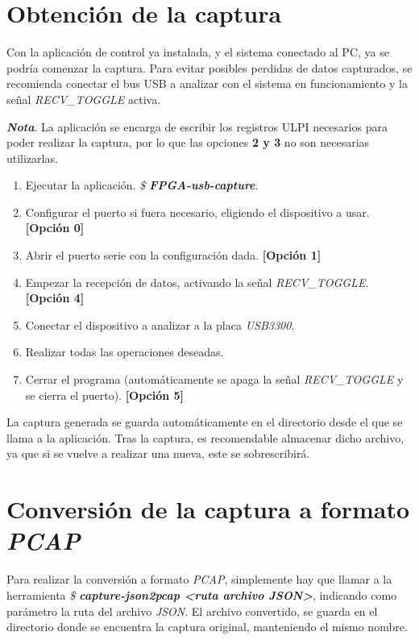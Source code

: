 \section{Obtención de la captura}
Con la aplicación de control ya instalada, y el sistema conectado al PC, ya se podría comenzar la captura.
Para evitar posibles perdidas de datos capturados, se recomienda conectar el bus USB a analizar con el sistema en funcionamiento y la señal \emph{RECV\_TOGGLE} activa.

\emph{\textbf{Nota}}. La aplicación se encarga de escribir los registros ULPI necesarios para poder realizar la captura, por lo que las opciones \textbf{2 y 3} no son necesarias utilizarlas.

\begin{enumerate}
    \item Ejecutar la aplicación. \emph{\$ \textbf{FPGA-usb-capture}}.
    \item Configurar el puerto si fuera necesario, eligiendo el dispositivo a usar. \textbf{[Opción 0]}
    \item Abrir el puerto serie con la configuración dada. \textbf{[Opción 1]}
    \item Empezar la recepción de datos, activando la señal \emph{RECV\_TOGGLE}. \textbf{[Opción 4]}
    \item Conectar el dispositivo a analizar a la placa \emph{USB3300}.
    \item Realizar todas las operaciones deseadas.
    \item Cerrar el programa (automáticamente se apaga la señal \emph{RECV\_TOGGLE} y se cierra el puerto). \textbf{[Opción 5]}
\end{enumerate}

La captura generada se guarda automáticamente en el directorio desde el que se llama a la aplicación. Tras la captura, es recomendable almacenar dicho archivo, ya que si se vuelve a realizar una nueva, este se sobrescribirá.

\section{Conversión de la captura a formato \emph{PCAP}}
Para realizar la conversión a formato \emph{PCAP}, simplemente hay que llamar a la herramienta \emph{\$ \textbf{capture-json2pcap <ruta archivo JSON>}}, indicando como parámetro la ruta del archivo \emph{JSON}. El archivo convertido, se guarda en el directorio donde se encuentra la captura original, manteniendo el mismo nombre.